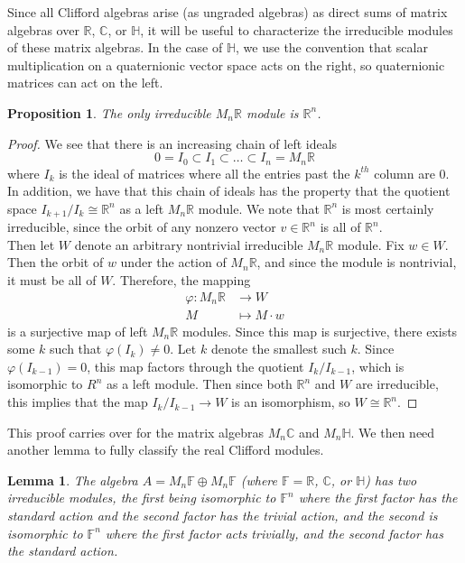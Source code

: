 \documentclass[psamsfonts]{amsart}
\newtheorem{prop}[thm]{Proposition}
\newtheorem{lem}[thm]{Lemma}
\theoremstyle{definition}
\theoremstyle{remark}
\newcommand{\R}{\mathbb{R}}
\renewcommand{\H}{\mathbb{H}}
\newcommand{\C}{\mathbb{C}}
\newcommand{\F}{\mathbb{F}}
\begin{document}
%
\fi
Since all Clifford algebras arise (as ungraded algebras) as direct sums of matrix algebras over $\R$, $\C$, or $\H$, it will be useful to characterize the irreducible modules of these matrix algebras. In the case of $\H$, we use the convention that scalar multiplication on a quaternionic vector space acts on the right, so quaternionic matrices can act on the left.
%
\begin{prop}
\item The only irreducible $M_n\R$  module is $\R^n$.
\end{prop}
%
\begin{proof}
We see that there is an increasing chain of left ideals 
\[
0 = I_0 \subset I_1 \subset \ldots \subset I_n = M_n\R
\]
where $I_k$ is the ideal of matrices where all the entries past the $k^{th}$ column are $0$. In addition, we have that this chain of ideals has the property that the quotient space $I_{k+1} / I_k \cong \R^n$ as a left $M_n\R$ module. We note that $\R^n$ is most certainly irreducible, since the orbit of any nonzero vector $v \in \R^n$ is all of $\R^n$. \\

Then let $W$ denote an arbitrary nontrivial irreducible $M_n\R$ module. Fix $w \in W$. Then the orbit of $w$ under the action of $M_n\R$, and since the module is nontrivial, it must be all of $W$. Therefore, the mapping 
\begin{align*}
\varphi : M_n\R &\to W \\
M &\mapsto M \cdot w
\end{align*}
is a surjective map of left $M_n\R$ modules. Since this map is surjective, there exists some $k$ such that $\varphi(I_k) \neq 0$. Let $k$ denote the smallest such $k$. Since $\varphi(I_{k-1}) = 0$, this map factors through the quotient $I_k / I_{k-1}$, which is isomorphic to $R^n$ as a left module. Then since both $\R^n$ and $W$ are irreducible, this implies that the map $I_k/I_{k-1} \to W$ is an isomorphism, so $W \cong \R^n$.
\end{proof}
%
This proof carries over for the matrix algebras $M_n\C$ and $M_n\H$. We then need another lemma to fully classify the real Clifford modules.
\begin{lem}
The algebra $A = M_n\F \oplus M_n\F$ (where $\F = \R$, $\C$, or $\H$) has two irreducible modules, the first being isomorphic to $\F^n$ where the first factor has the standard action and the second factor has the trivial action, and the second is isomorphic to $\F^n$ where the first factor acts trivially, and the second factor has the standard action.
\end{lem}
\end{document}
